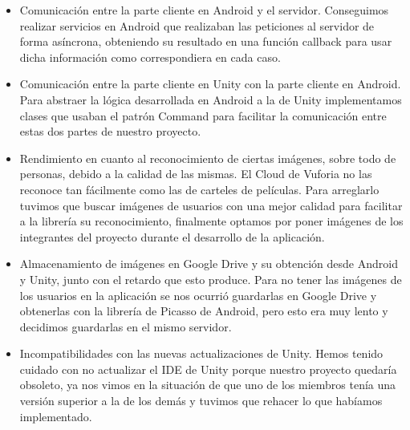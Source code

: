 \begin{itemize}
    \item Comunicación entre la parte cliente en Android y el servidor. Conseguimos realizar servicios en Android que realizaban las peticiones al servidor de forma asíncrona, obteniendo su resultado en una función callback para usar dicha información como correspondiera en cada caso.
    \item Comunicación entre la parte cliente en Unity con la parte cliente en Android. Para abstraer la lógica desarrollada en Android a la de Unity implementamos clases que usaban el patrón Command para facilitar la comunicación entre estas dos partes de nuestro proyecto.
    \item Rendimiento en cuanto al reconocimiento de ciertas imágenes, sobre todo de personas, debido a la calidad de las mismas. El Cloud de Vuforia no las reconoce tan fácilmente como las de carteles de películas. Para arreglarlo tuvimos que buscar imágenes de usuarios con una mejor calidad para facilitar a la librería su reconocimiento, finalmente optamos por poner imágenes de los integrantes del proyecto durante el desarrollo de la aplicación.
    \item Almacenamiento de imágenes en Google Drive y su obtención desde Android y Unity, junto con el retardo que esto produce. Para no tener las imágenes de los usuarios en la aplicación se nos ocurrió guardarlas en Google Drive y obtenerlas con la librería de Picasso de Android, pero esto era muy lento y decidimos guardarlas en el mismo servidor.
    \item Incompatibilidades con las nuevas actualizaciones de Unity. Hemos tenido cuidado con no actualizar el IDE de Unity porque nuestro proyecto quedaría obsoleto, ya nos vimos en la situación de que uno de los miembros tenía una versión superior a la de los demás y tuvimos que rehacer lo que habíamos implementado.
\end{itemize}
